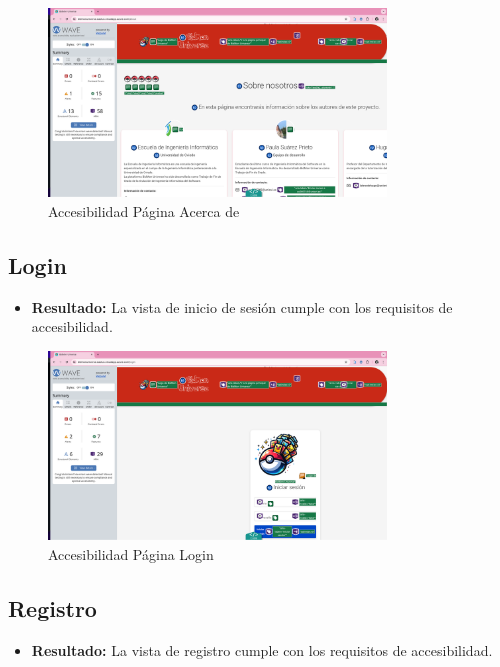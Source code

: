 \begin{figure}[H]
    \centering
    \includegraphics[width=0.8\textwidth]{figures/accesibilidad/A-acc-about.png}
    \caption{Accesibilidad Página Acerca de}
    \label{fig:Acc-Acerca}
\end{figure}

\subsection*{Login}
\begin{itemize}
    \item \textbf{Resultado:} La vista de inicio de sesión cumple con los requisitos de accesibilidad.
\end{itemize}

\begin{figure}[H]
    \centering
    \includegraphics[width=0.8\textwidth]{figures/accesibilidad/A-acc-login.png}
    \caption{Accesibilidad Página Login}
    \label{fig:Acc-Login}
\end{figure}

\subsection*{Registro}
\begin{itemize}
    \item \textbf{Resultado:} La vista de registro cumple con los requisitos de accesibilidad.
\end{itemize}

